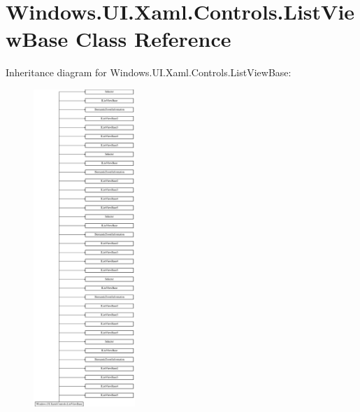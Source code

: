\hypertarget{class_windows_1_1_u_i_1_1_xaml_1_1_controls_1_1_list_view_base}{}\section{Windows.\+U\+I.\+Xaml.\+Controls.\+List\+View\+Base Class Reference}
\label{class_windows_1_1_u_i_1_1_xaml_1_1_controls_1_1_list_view_base}
Inheritance diagram for Windows.\+U\+I.\+Xaml.\+Controls.\+List\+View\+Base\+:\begin{figure}[H]
\begin{center}
\leavevmode
\includegraphics[height=12.000000cm]{class_windows_1_1_u_i_1_1_xaml_1_1_controls_1_1_list_view_base}
\end{center}
\end{figure}
